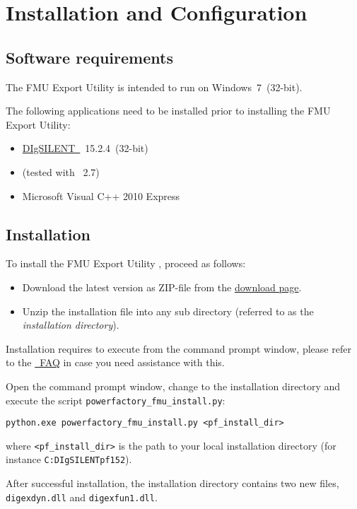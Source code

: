 \chapter{Installation and Configuration}

\section{Software requirements}

The \fmipp \pf FMU Export Utility is intended to run on Windows~7~(32-bit).

The following applications need to be installed prior to installing the \fmipp \pf FMU Export Utility:
\begin{itemize}
  \item \href{http://www.digsilent.com/}{DIgSILENT~\pf}~15.2.4~(32-bit)
  \item \href{https://www.python.org/}{\python} (tested with \python~2.7)
  \item Microsoft Visual C++ 2010 Express
\end{itemize}


\section{Installation}
\label{sec:install}

To install the \fmipp \pf FMU Export Utility , proceed as follows:
\begin{itemize}
  \item Download the latest version as ZIP-file from the \href{http://sourceforge.net/projects/powerfactory-fmu/files/latest/download}{download page}.
  \item Unzip the installation file into any sub directory (referred to as the \emph{installation directory}).
\end{itemize}

Installation requires to execute \python from the command prompt window, please refer to the \href{https://docs.python.org/2/faq/windows.html}{\python~FAQ} in case you need assistance with this.

Open the command prompt window, change to the installation directory and execute the script \texttt{powerfactory\_fmu\_install.py}:
\begin{verbatim}
python.exe powerfactory_fmu_install.py <pf_install_dir>
\end{verbatim}
where \texttt{<pf\_install\_dir>} is the path to your local \pf installation directory (for instance \texttt{C:DIgSILENTpf152}).

After successful installation, the \pf installation directory contains two new files, \texttt{digexdyn.dll} and \texttt{digexfun1.dll}.
